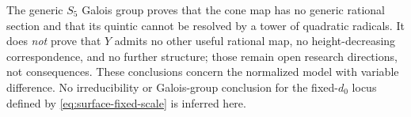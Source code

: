\begin{remark}
The generic $S_5$ Galois group proves that the cone map has no generic rational
section and that its quintic cannot be resolved by a tower of quadratic
radicals. It does \emph{not} prove that $Y$ admits no other useful rational
map, no height-decreasing correspondence, and no further structure; those
remain open research directions, not consequences.
These conclusions concern the normalized model with variable difference.
No irreducibility or Galois-group conclusion for the fixed-$d_0$ locus
defined by \eqref{eq:surface-fixed-scale} is inferred here.
\end{remark}
